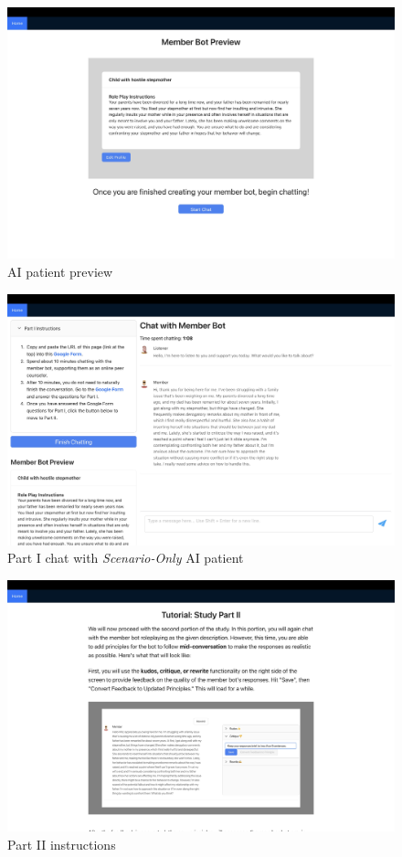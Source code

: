 \documentclass[11pt]{article}
\begin{document}
\begin{figure}[ht]
    \centering
    \includegraphics[width=\textwidth]{Study Screenshots/Screen4.jpeg}
    \caption{AI patient preview}
    \label{fig:screen4}
\end{figure}

\begin{figure}[ht]
    \centering
    \includegraphics[width=\textwidth]{Study Screenshots/Screen5.jpeg}
    \caption{Part I chat with \textit{Scenario-Only} AI patient}
    \label{fig:screen5}
\end{figure}

\begin{figure}[ht]
    \centering
    \includegraphics[width=\textwidth]{Study Screenshots/Screen6.jpeg}
    \caption{Part II instructions}
    \label{fig:screen6}
\end{figure}
\end{document}
